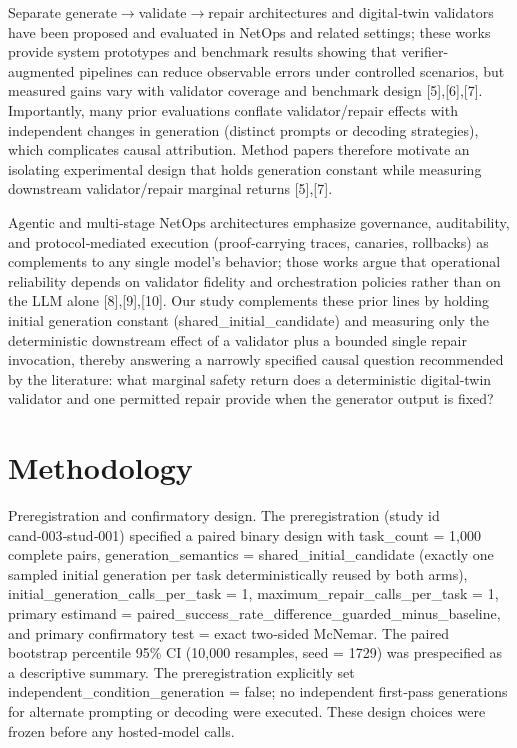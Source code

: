 \documentclass[conference]{IEEEtran}
\begin{document}
Separate generate\ensuremath{\rightarrow}validate\ensuremath{\rightarrow}repair architectures and digital‑twin validators have been proposed and evaluated in NetOps and related settings; these works provide system prototypes and benchmark results showing that verifier-augmented pipelines can reduce observable errors under controlled scenarios, but measured gains vary with validator coverage and benchmark design [5],[6],[7]. Importantly, many prior evaluations conflate validator/repair effects with independent changes in generation (distinct prompts or decoding strategies), which complicates causal attribution. Method papers therefore motivate an isolating experimental design that holds generation constant while measuring downstream validator/repair marginal returns [5],[7].

Agentic and multi‑stage NetOps architectures emphasize governance, auditability, and protocol‑mediated execution (proof‑carrying traces, canaries, rollbacks) as complements to any single model's behavior; those works argue that operational reliability depends on validator fidelity and orchestration policies rather than on the LLM alone [8],[9],[10]. Our study complements these prior lines by holding initial generation constant (shared\_initial\_candidate) and measuring only the deterministic downstream effect of a validator plus a bounded single repair invocation, thereby answering a narrowly specified causal question recommended by the literature: what marginal safety return does a deterministic digital‑twin validator and one permitted repair provide when the generator output is fixed?

\section{Methodology}
Preregistration and confirmatory design. The preregistration (study id cand‑003‑stud‑001) specified a paired binary design with task\_count = 1,000 complete pairs, generation\_semantics = shared\_initial\_candidate (exactly one sampled initial generation per task deterministically reused by both arms), initial\_generation\_calls\_per\_task = 1, maximum\_repair\_calls\_per\_task = 1, primary estimand = paired\_success\_rate\_difference\_guarded\_minus\_baseline, and primary confirmatory test = exact two‑sided McNemar. The paired bootstrap percentile 95\% CI (10,000 resamples, seed = 1729) was prespecified as a descriptive summary. The preregistration explicitly set independent\_condition\_generation = false; no independent first‑pass generations for alternate prompting or decoding were executed. These design choices were frozen before any hosted‑model calls.
\end{document}
